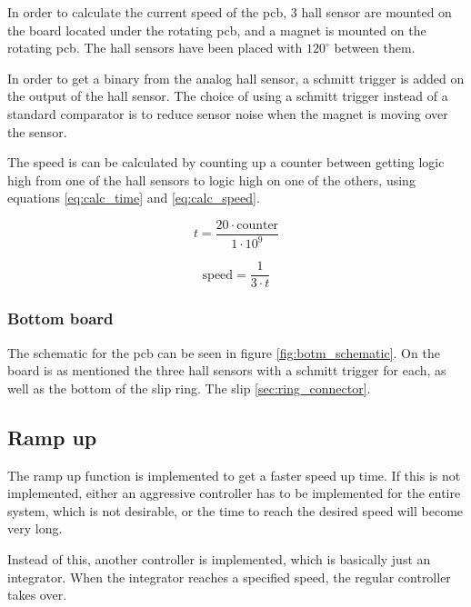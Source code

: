 In order to calculate the current speed of the pcb, 3 hall sensor are mounted on the board located under the rotating pcb, and a magnet is mounted on the rotating pcb.
The hall sensors have been placed with $120^{\circ}$ between them.

In order to get a binary from the analog hall sensor, a schmitt trigger is added on the output of the hall sensor.
The choice of using a schmitt trigger instead of a standard comparator is to reduce sensor noise when the magnet is moving over the sensor.

The speed is can be calculated by counting up a counter between getting logic high from one of the hall sensors to  logic high on one of the others, using equations  \ref{eq:calc_time} and \ref{eq:calc_speed}.

\begin{equation} \label{eq:calc_time}
 t = \frac{20\cdot \text{counter}}{1\cdot 10^9}
\end{equation}

\begin{equation} \label{eq:calc_speed}
 \text{speed} = \frac{1}{3\cdot t}
\end{equation}

\subsubsection{Bottom board}
The schematic for the pcb can be seen in figure \ref{fig:botm_schematic}.
On the board is as mentioned the three hall sensors with a schmitt trigger for each, as well as the bottom of the slip ring. The slip \ref{sec:ring_connector}. 


\subsection{Ramp up}

The ramp up function is implemented to get a faster speed up time.
If this is not implemented, either an aggressive controller has to be implemented for the entire system, which is not desirable, or the time to reach the desired speed will become very long.

Instead of this, another controller is implemented, which is basically just an integrator.
When the integrator reaches a specified speed, the regular controller takes over. 